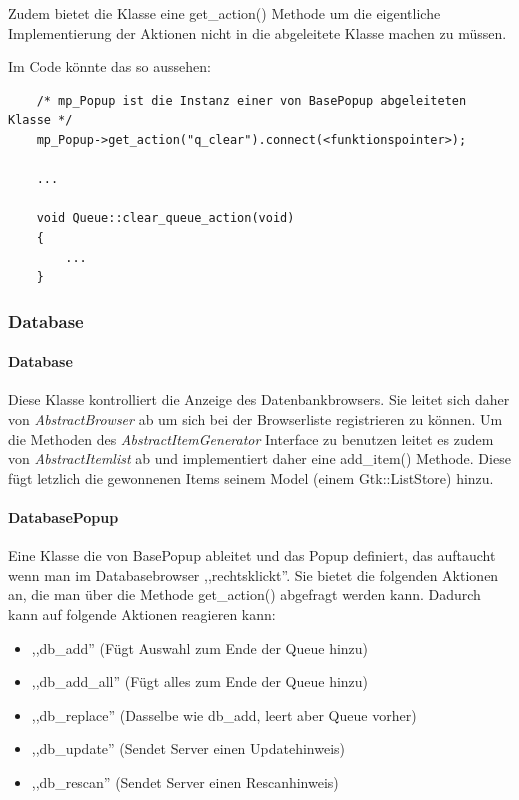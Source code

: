Zudem bietet die Klasse eine get\_action() Methode um die eigentliche Implementierung der Aktionen nicht in die abgeleitete Klasse machen zu müssen. 

Im Code könnte das so aussehen:
\begin{verbatim}
    /* mp_Popup ist die Instanz einer von BasePopup abgeleiteten Klasse */
    mp_Popup->get_action("q_clear").connect(<funktionspointer>);

    ...

    void Queue::clear_queue_action(void)
    {
        ...
    }
\end{verbatim}


\subsubsection{Database}
\paragraph{Database}
Diese Klasse kontrolliert die Anzeige des Datenbankbrowsers. Sie leitet sich daher von \emph{AbstractBrowser} ab um sich bei der Browserliste registrieren zu können.
Um die Methoden des \emph{AbstractItemGenerator} Interface zu benutzen leitet es zudem von \emph{AbstractItemlist} ab und implementiert daher eine add\_item() Methode. 
Diese fügt letzlich die gewonnenen Items seinem Model (einem Gtk::ListStore) hinzu.

\paragraph{DatabasePopup}
Eine Klasse die von BasePopup ableitet und das Popup definiert, das auftaucht wenn man im Databasebrowser ,,rechtsklickt''.
Sie bietet die folgenden Aktionen an, die man über die Methode get\_action() abgefragt werden kann.
Dadurch kann auf folgende Aktionen reagieren kann:
\begin{itemize}
\item ,,db\_add'' (Fügt Auswahl zum Ende der Queue hinzu)
\item ,,db\_add\_all'' (Fügt alles zum Ende der Queue hinzu)
\item ,,db\_replace'' (Dasselbe wie db\_add, leert aber Queue vorher)
\item ,,db\_update'' (Sendet Server einen Updatehinweis)
\item ,,db\_rescan'' (Sendet Server einen Rescanhinweis)
\end{itemize}


